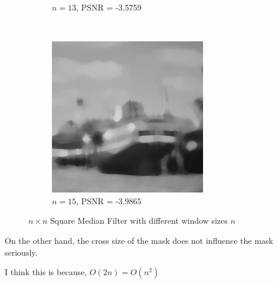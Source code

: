 \documentclass{article}
\begin{document}
\begin{enumerate}[label=(\alph*)]
\begin{figure}[!htb]
\begin{subfigure}[b]{0.3\textwidth}
            \caption{$n = 13$, PSNR = -3.5759}
        \end{subfigure}
        ~
        \begin{subfigure}[b]{0.3\textwidth}
            \includegraphics[width=\textwidth]{img/RS15.png}
            \caption{$n = 15$, PSNR = -3.9865}
        \end{subfigure}
        \caption{$n \times n$ Square Median Filter with different window sizes $n$}
        \label{n x n Square Median Filter with different window sizes $n$}
    \end{figure} 

    \newpage
    On the other hand, the cross size of the mask does not influence the mask seriously.

    I think this is because, $O(2n) = O(n^2)$

    \begin{figure}[!htb]
        \centering
        

\end{figure}
\end{enumerate}
\end{document}
